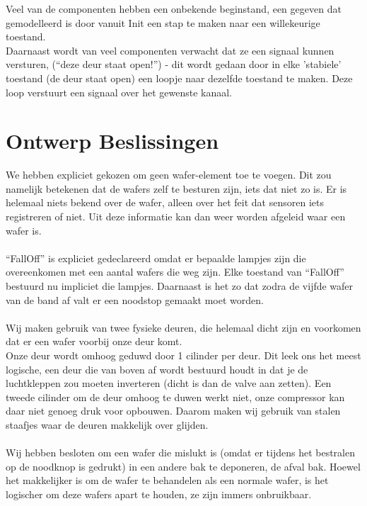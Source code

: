 Veel van de componenten hebben een onbekende beginstand, een gegeven dat gemodelleerd is door vanuit Init een stap te maken naar een willekeurige toestand.\\
Daarnaast wordt van veel componenten verwacht dat ze een signaal kunnen versturen,  (``deze deur staat open!'') - dit wordt gedaan door in elke  'stabiele' toestand (de deur staat open) een loopje naar dezelfde toestand te maken. Deze loop verstuurt een signaal over het gewenste kanaal.



\section{Ontwerp Beslissingen}\label{sec:ontwerp_beslissingen} %

We hebben expliciet gekozen om geen wafer-element toe te voegen. Dit
zou namelijk betekenen dat de wafers zelf te besturen zijn, iets dat
niet zo is. Er is helemaal niets bekend over de wafer, alleen over
het feit dat sensoren iets registreren of niet. Uit deze informatie
kan dan weer worden afgeleid waar een wafer is.\\ \\ 

``FallOff'' is expliciet gedeclareerd omdat er bepaalde lampjes zijn
die overeenkomen met een aantal wafers die weg zijn. Elke toestand van
``FallOff'' bestuurd nu impliciet die lampjes. Daarnaast is het zo dat
zodra de vijfde wafer van de band af valt er een noodstop gemaakt
moet worden. \\ \\ 

Wij maken gebruik van twee fysieke deuren, die helemaal dicht zijn en voorkomen dat er een wafer voorbij onze deur komt. \\
Onze deur wordt omhoog geduwd door 1 cilinder per deur. Dit leek ons het meest logische, een deur die van boven af wordt bestuurd houdt in dat je de luchtkleppen zou moeten inverteren (dicht is dan de valve aan zetten). Een tweede cilinder om de deur omhoog te duwen werkt niet, onze compressor kan daar niet genoeg druk voor opbouwen. Daarom maken wij gebruik van stalen staafjes waar de deuren makkelijk over glijden. \\ \\

Wij hebben besloten om een wafer die mislukt is (omdat er tijdens het bestralen op de noodknop is gedrukt) in een andere bak te deponeren, de afval bak. Hoewel het makkelijker is om de wafer te behandelen als een normale wafer, is het logischer om deze wafers apart te houden, ze zijn immers onbruikbaar. \\ \\

